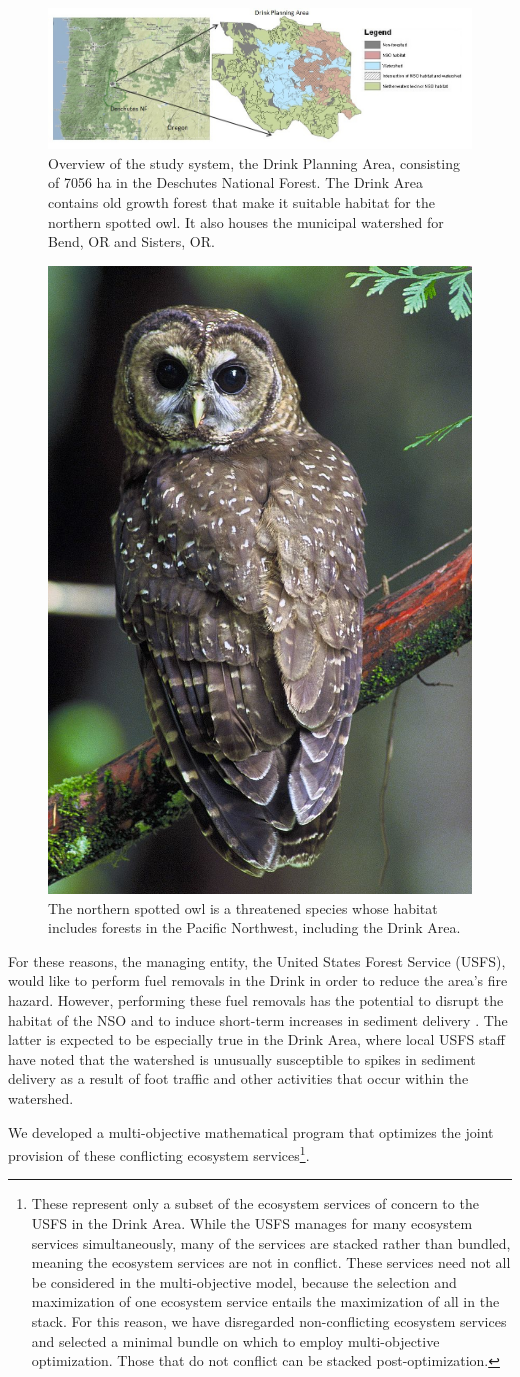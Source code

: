 \begin{figure}[ht]
\centering
\includegraphics[width=.9\textwidth]{../images/Drink_Overview}
\caption[Overview of the study system, the Drink Planning Area]{Overview of the study system, the Drink Planning Area, consisting of 7056 ha in the Deschutes National Forest. The Drink Area contains old growth forest that make it suitable habitat for the northern spotted owl. It also houses the municipal watershed for Bend, OR and Sisters, OR.}
\label{fig:drinkOverview}
\end{figure}

\begin{figure}
\centering
\caption[Northern spotted owl]{The northern spotted owl is a threatened species whose habitat includes forests in the Pacific Northwest, including the Drink Area.}
\label{fig:nso}
\includegraphics[width=.2\textwidth]{../images/NorthernSpottedOwl_USFWS}
\end{figure}

For these reasons, the managing entity, the United States Forest Service (USFS), would like to perform fuel removals in the Drink in order to reduce the area's fire hazard. However, performing these fuel removals has the potential to disrupt the habitat of the NSO \cite{bond2002short} and to induce short-term increases in sediment delivery \cite{o2005conceptual}. The latter is expected to be especially true in the Drink Area, where local USFS staff have noted that the watershed is unusually susceptible to spikes in sediment delivery as a result of foot traffic and other activities that occur within the watershed.

We developed a multi-objective mathematical program that optimizes the joint provision of these conflicting ecosystem services\footnote{These represent only a subset of the ecosystem services of concern to the USFS in the Drink Area. While the USFS manages for many ecosystem services simultaneously, many of the services are stacked rather than bundled, meaning the ecosystem services are not in conflict. These services need not all be considered in the multi-objective model, because the selection and maximization of one ecosystem service entails the maximization of all in the stack. For this reason, we have disregarded non-conflicting ecosystem services and selected a minimal bundle on which to employ multi-objective optimization. Those that do not conflict can be stacked post-optimization.}.

